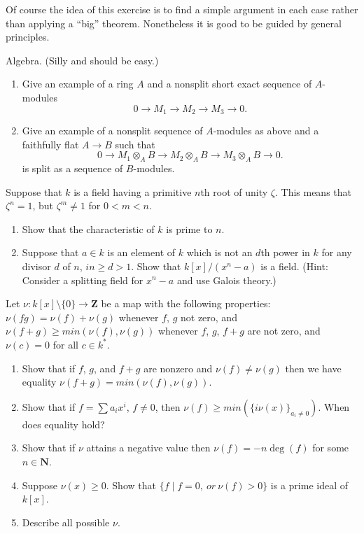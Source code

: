 \begin{remark}
Of course the idea of this exercise is to find 
a simple argument in each case rather than applying a ``big'' theorem.
Nonetheless it is good to be guided by general principles.
\end{remark}

\begin{exercise}
Algebra. (Silly and should be easy.)
\begin{enumerate}
\item Give an example of a ring $A$ and a nonsplit
short exact sequence of $A$-modules
$$
0 \to M_1 \to M_2 \to M_3 \to 0.
$$
\item Give an example of a nonsplit sequence of $A$-modules
as above and a faithfully flat $A \to B$ such that 
$$
0 \to M_1\otimes_AB \to M_2\otimes_AB \to M_3\otimes_AB \to 0.
$$
is split as a sequence of $B$-modules.
\end{enumerate}
\end{exercise}

\begin{exercise}
Suppose that $k$ is a field having a primitive $n$th root
of unity $\zeta$. This means that $\zeta^n = 1$, but $\zeta^m\not=1$ for 
$0<m<n$.
\begin{enumerate}
\item Show that the characteristic of $k$ is prime to $n$.
\item Suppose that $a \in k$ is an element of $k$ which is not
an $d$th power in $k$ for any divisor $d$ of $n$, $in\geq d>1$. Show that
$k[x]/(x^n-a)$ is a field. (Hint: Consider a splitting field for
$x^n-a$ and use Galois theory.)
\end{enumerate}
\end{exercise}

\begin{exercise}
Let $\nu : k[x]\setminus \{0\}  \to {\mathbf Z}$ be a map
with the following properties: $\nu(fg) = \nu(f) + \nu(g)$ whenever
$f$, $g$ not zero, and  $\nu(f+g) \geq min(\nu(f),\nu(g))$ whenever 
$f$, $g$, $f+g$ are not zero, and $\nu(c)=0$ for all $c\in k^*$.
\begin{enumerate}
\item Show that if $f$, $g$, and $f+g$ are nonzero and
$\nu(f) \not= \nu(g)$ then we have equality $\nu(f+g) = min(\nu(f),\nu(g))$.
\item Show that if $f=\sum a_i x^i$, $f\not=0$, then
$\nu(f) \geq min(\{i\nu(x)\}_{a_i\not=0})$. When does equality hold?
\item Show that if $\nu$ attains a negative value then
$\nu(f) = -n \deg(f)$ for some $n\in {\mathbf N}$.
\item Suppose $\nu(x) \geq 0$. Show that
$\{f \mid f=0,\ or\ \nu(f) > 0\}$ is a prime ideal of $k[x]$.
\item Describe all possible $\nu$.
\end{enumerate}
\end{exercise}














